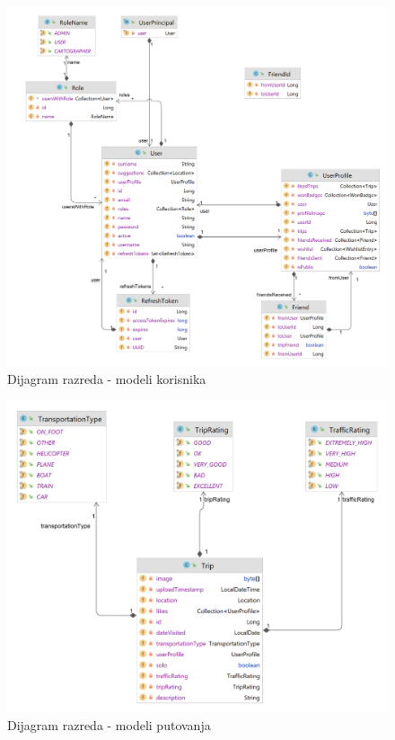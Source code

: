                 \begin{figure}[H]
        			\includegraphics[scale=0.2]{slike/class/class_model_user.png}
        		\centering
        		\caption{Dijagram razreda - modeli korisnika}
        	\end{figure}
         
                \begin{figure}[H]
        			\includegraphics[scale=0.2]{slike/class/class_model_trip.png}
        		\centering
        		\caption{Dijagram razreda - modeli putovanja}
        	\end{figure}


